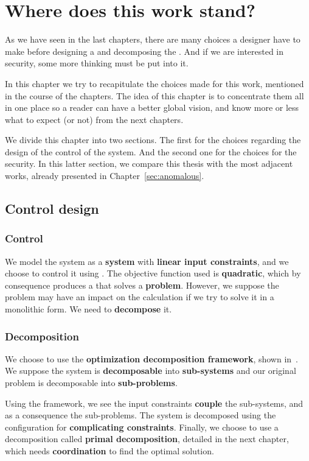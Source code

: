 \documentclass[../main.tex]{subfiles}
\begin{document}
\chapter{Where does this work stand?}\label{sec:positioning}
As we have seen in the last chapters, there are many choices a designer have to make before designing a \cps{} and decomposing the \mpc{}.
And if we are interested in security, some more thinking must be put into it.

In this chapter we try to recapitulate the choices made for this work, mentioned in the course of the chapters.
The idea of this chapter is to concentrate them all in one place so a reader can have a better global vision, and know more or less what to expect (or not) from the next chapters.

We divide this chapter into two sections.
The first for the choices regarding the design of the control of the system.
And the second one for the choices for the security.
In this latter section, we compare this thesis with the most adjacent works, already presented in Chapter~\ref{sec:anomalous}.

\section{Control design}
\subsection{Control}\label{sec:control_chosen}
We model the system as a \textbf{\ltidt{} system} with \textbf{linear input constraints}, and we choose to control it using \textbf{\mpc{}}.
The objective function used is \textbf{quadratic}, which by consequence produces a \mpc{} that solves a \textbf{\qp{} problem}.
However, we suppose the problem may have an impact on the calculation if we try to solve it in a monolithic form. We need to \textbf{decompose} it.

\subsection{Decomposition}\label{sec:decomposition_chosen}
We choose to use the \textbf{optimization decomposition framework}, shown in~\cite{ConejoEtAl2006,BoydEtAl2015}.
We suppose the system is \textbf{decomposable} into \textbf{sub-systems} and our original problem is decomposable into \textbf{sub-problems}.

Using the framework, we see the input constraints \textbf{couple} the sub-systems, and as a consequence the sub-problems.
The system is decomposed using the configuration for \textbf{complicating constraints}. Finally, we choose to use a decomposition called \textbf{primal decomposition}, detailed in the next chapter, which needs \textbf{coordination} to find the optimal solution.
\end{document}
